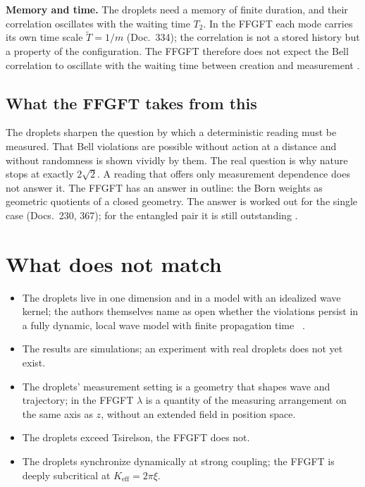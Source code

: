 \textbf{Memory and time.} The droplets need a memory of finite duration, and their correlation
oscillates with the waiting time $T_2$. In the FFGFT each mode carries its own time scale
$\tilde T=1/m$ (Doc.~334); the correlation is not a stored history but a property of the
configuration. The FFGFT therefore does not expect the Bell correlation to oscillate with the waiting
time between creation and measurement \SM.

\subsection{What the FFGFT takes from this}

The droplets sharpen the question by which a deterministic reading must be measured. That Bell
violations are possible without action at a distance and without randomness is shown vividly by
them. The real question is why nature stops at exactly $2\sqrt2$. A reading that offers only
measurement dependence does not answer it. The FFGFT has an answer in outline: the Born weights as
geometric quotients of a closed geometry. The answer is worked out for the single case (Docs.~230,
367); for the entangled pair it is still outstanding \SM.

\section{What does not match}

\begin{itemize}[leftmargin=2em,itemsep=3pt,topsep=3pt]
  \item The droplets live in one dimension and in a model with an idealized wave kernel; the authors
        themselves name as open whether the violations persist in a fully dynamic, local wave model
        with finite propagation time \QM~\cite{Lopez2026}.
  \item The results are simulations; an experiment with real droplets does not yet exist.
  \item The droplets' measurement setting is a geometry that shapes wave and trajectory; in the FFGFT
        $\lambda$ is a quantity of the measuring arrangement on the same axis as $z$, without an
        extended field in position space.
  \item The droplets exceed Tsirelson, the FFGFT does not.
  \item The droplets synchronize dynamically at strong coupling; the FFGFT is deeply subcritical at
        $K_{\mathrm{eff}}=2\pi\xi$.
\end{itemize}

